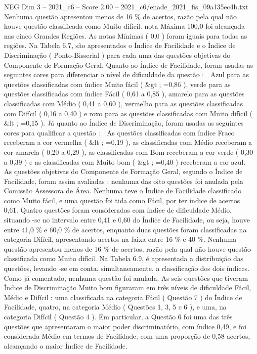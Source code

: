 \begin{textsample}{NEG Dim 3 – 2021\_c6 – Score 2.00 – 2021\_c6/enade\_2021\_fis\_09a135ec4b.txt}
Nenhuma questão apresentou menos de 16 \% de acertos, razão pela qual não houve questão classificada como Muito difícil. nota Máxima 100,0 foi alcançada nas cinco Grandes Regiões.
As notas Mínimas ( 0,0 ) foram iguais para todas as regiões.
Na Tabela 6.7, são apresentados o Índice de Facilidade e o Índice de Discriminação ( Ponto-Bisserial ) para cada uma das questões objetivas do Componente de Formação Geral.
Quanto ao Índice de Facilidade, foram usadas as seguintes cores para diferenciar o nível de dificuldade da questão :  Azul para as questões classificadas com índice Muito fácil ( \&gt ; =0,86 ), verde para as questões classificadas com índice Fácil ( 0,61 a 0,85 ), amarelo para as questões classificadas com Médio ( 0,41 a 0,60 ), vermelho para as questões classificadas com Difícil ( 0,16 a 0,40 ) e roxo para as questões classificadas com Muito difícil ( \&lt ; =0,15 ).
Já quanto ao Índice de Discriminação, foram usadas as seguintes cores para qualificar a questão :  As questões classificadas com índice Fraco receberam a cor vermelha ( \&lt ; =0,19 ), as classificadas com Médio receberam a cor amarela ( 0,20 a 0,29 ), as classificadas com Bom receberam a cor verde ( 0,30 a 0,39 ) e as classificadas com Muito bom ( \&gt ; =0,40 ) receberam a cor azul.
As questões objetivas do Componente de Formação Geral, segundo o Índice de Facilidade, foram assim avaliadas : nenhuma das oito questões foi anulada pela Comissão Assessora de Área.
Nenhuma teve o Índice de Facilidade classificado como Muito fácil, e uma questão foi tida como Fácil, por ter índice de acertos 0,61.
Quatro questões foram consideradas com índice de dificuldade Médio, situando -se no intervalo entre 0,41 e 0,60 do Índice de Facilidade, ou seja, houve entre 41,0 \% e 60,0 \% de acertos, enquanto duas questões foram classificadas na categoria Difícil, apresentando acertos na faixa entre 16 \% e 40 \%.
Nenhuma questão apresentou menos de 16 \% de acertos, razão pela qual não houve questão classificada como Muito difícil.
Na Tabela 6.9, é apresentada a distribuição das questões, levando -se em conta, simultaneamente, a classificação dos dois índices.
Como já comentado, nenhuma questão foi anulada.
As seis questões que tiveram Índice de Discriminação Muito bom figuraram em três níveis de dificuldade Fácil, Médio e Difícil : uma classificada na categoria Fácil ( Questão 7 ) do Índice de Facilidade, quatro, na categoria Médio ( Questões 1, 3, 5 e 6 ), e uma, na categoria Difícil ( Questão 4 ).
Em particular, a Questão 6 foi uma das três questões que apresentaram o maior poder discriminatório, com índice 0,49, e foi considerada Médio em termos de Facilidade, com uma proporção de 0,58 acertos, alcançando o maior Índice de Facilidade.

\end{textsample}
